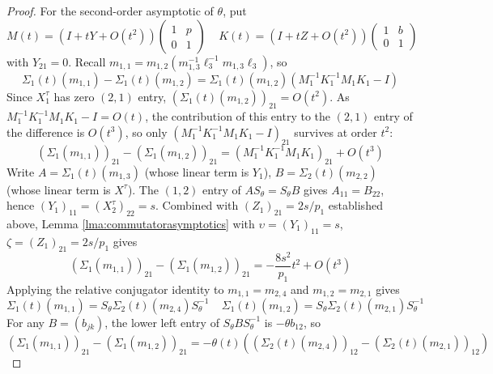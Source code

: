 \documentclass{article}
\theoremstyle{plain}
\theoremstyle{definition}
\theoremstyle{plain}
\theoremstyle{plain}
\theoremstyle{plain}
\theoremstyle{remark}
\theoremstyle{remark}
\theoremstyle{plain}
\theoremstyle{plain}
\theoremstyle{plain}
\theoremstyle{plain}
\begin{document}
\begin{proof}
For the second-order asymptotic of $\theta$, put 
\begin{equation*}
	M(t) = (I + tY + O(t^2))\begin{pmatrix}1&p\\0&1\end{pmatrix} \ \ \ \ \ K(t) = (I + tZ + O(t^2))\begin{pmatrix}1&b\\0&1\end{pmatrix}
\end{equation*}
with $Y_{21} = 0$. Recall $m_{1, 1} = m_{1,2}(m_{1,3}^{-1}\ell_3^{-1}m_{1,3}\ell_3)$, so 
\begin{equation*}
	\Sigma_1(t)(m_{1,1}) - \Sigma_1(t)(m_{1, 2}) = \Sigma_1(t)(m_{1, 2})(M_1^{-1}K_1^{-1}M_1K_1 - I)
\end{equation*}
Since $X_1^\tau$ has zero $(2, 1)$ entry, $(\Sigma_1(t)(m_{1, 2}))_{21} = O(t^2)$. As $M_1^{-1}K_1^{-1}M_1K_1 - I = O(t)$, the contribution of this entry to the $(2, 1)$ entry of the difference is $O(t^3)$, so only $(M_1^{-1}K_1^{-1}M_1K_1 - I)_{21}$ survives at order $t^2$:
\begin{equation*}
	(\Sigma_1(m_{1,1}))_{21} - (\Sigma_1(m_{1,2}))_{21} = (M_1^{-1}K_1^{-1}M_1K_1)_{21} + O(t^3)
\end{equation*}
Write $A = \Sigma_1(t)(m_{1,3})$ (whose linear term is $Y_1$), $B = \Sigma_2(t)(m_{2, 2})$ (whose linear term is $X^\tau$). The $(1, 2)$ entry of $AS_\theta = S_\theta B$ gives $A_{11} = B_{22}$, hence $(Y_1)_{11} = (X_2^\tau)_{22} = s$. Combined with $(Z_1)_{21} = 2s/p_1$ established above, Lemma \ref{lma:commutatorasymptotics} with $\upsilon = (Y_1)_{11} = s$, $\zeta = (Z_1)_{21} = 2s/p_1$ gives
\begin{equation}\label{eq:first}
	(\Sigma_1(m_{1,1}))_{21} - (\Sigma_1(m_{1,2}))_{21} = -\frac{8s^2}{p_1}t^2 + O(t^3)
\end{equation}
Applying the relative conjugator identity to $m_{1, 1} = m_{2, 4}$ and $m_{1, 2} = m_{2, 1}$ gives 
\begin{equation*}
	\Sigma_1(t)(m_{1, 1}) = S_\theta\Sigma_2(t)(m_{2, 4})S_\theta^{-1} \ \ \ \ \ \Sigma_1(t)(m_{1, 2}) = S_\theta\Sigma_2(t)(m_{2, 1})S_\theta^{-1}
\end{equation*}
For any $B = (b_{jk})$, the lower left entry of $S_\theta BS_\theta^{-1}$ is $-\theta b_{12}$, so
\begin{equation*}
	(\Sigma_1(m_{1,1}))_{21} - (\Sigma_1(m_{1,2}))_{21} = -\theta(t)((\Sigma_2(t)(m_{2, 4}))_{12} - (\Sigma_2(t)(m_{2, 1}))_{12})
\end{equation*}

\end{proof}
\end{document}
